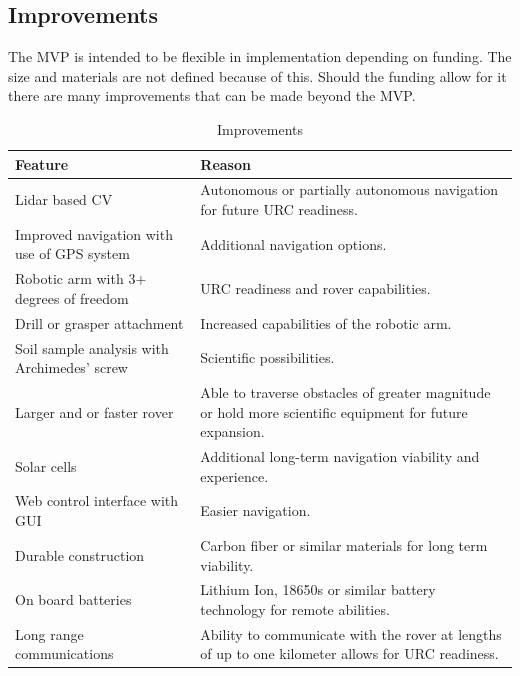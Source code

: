 \documentclass[conference]{IEEEtran} %
\begin{document}
\subsection{Improvements}
The MVP is intended to be flexible in implementation depending on funding. The size and materials are not defined because of this. Should the funding allow for it there are many improvements that can be made beyond the MVP. 

\begin{table}[ht!]
    \caption{Improvements}
    \centering
    {\renewcommand{\arraystretch}{1.5}
    \begin{tabularx}{\linewidth}{LL}
    \hline
    \textbf{Feature} & \textbf{Reason} \\  
    \hline
    Lidar based CV & Autonomous or partially autonomous navigation for future URC readiness. \\
    Improved navigation with use of GPS system & Additional navigation options. \\
    Robotic arm with 3+ degrees of freedom & URC readiness and rover capabilities. \\ 
    Drill or grasper attachment & Increased capabilities of the robotic arm. \\
    Soil sample analysis with Archimedes' screw & Scientific possibilities. \\
    Larger and or faster rover & Able to traverse obstacles of greater magnitude or hold more scientific equipment for future expansion. \\
    Solar cells & Additional long-term navigation viability and experience. \\
    Web control interface with GUI & Easier navigation. \\
    Durable construction & Carbon fiber or similar materials for long term viability. \\
    On board batteries & Lithium Ion, 18650s or similar battery technology for remote abilities. \\
    Long range communications & Ability to communicate with the rover at lengths of up to one kilometer allows for URC readiness. \\
    \hline
    \end{tabularx}
    }
\label{tab:mvp-two}
\end{table}
\end{document}
